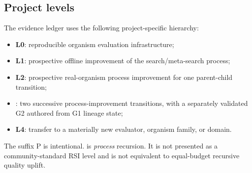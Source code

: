 \subsection{Project levels}

The evidence ledger uses the following project-specific hierarchy:
\begin{itemize}
  \item \textbf{L0}: reproducible organism evaluation infrastructure;
  \item \textbf{L1}: prospective offline improvement of the search/meta-search process;
  \item \textbf{L2}: prospective real-organism process improvement for one parent-child transition;
  \item \textbf{\lthreep}: two successive process-improvement transitions, with a separately validated G2 authored from G1 lineage state;
  \item \textbf{L4}: transfer to a materially new evaluator, organism family, or domain.
\end{itemize}

The suffix P is intentional. \lthreep is \emph{process} recursion. It is not presented as a community-standard RSI level and is not equivalent to equal-budget recursive quality uplift.

